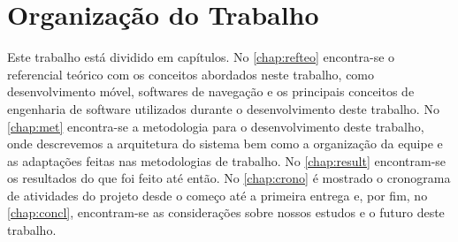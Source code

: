 \section{Organização do Trabalho}

Este trabalho está dividido em capítulos. No \autoref{chap:refteo} encontra-se o referencial teórico com os conceitos abordados neste trabalho, como desenvolvimento móvel, softwares de navegação e os principais conceitos de engenharia de software utilizados durante o desenvolvimento deste trabalho. No \autoref{chap:met} encontra-se a metodologia para o desenvolvimento deste trabalho, onde descrevemos a arquitetura do sistema bem como a organização da equipe e as adaptações feitas nas metodologias de trabalho. No \autoref{chap:result} encontram-se os resultados do que foi feito até então. No \autoref{chap:crono} é mostrado o cronograma de atividades do projeto desde o começo até a primeira entrega e, por fim, no \autoref{chap:concl}, encontram-se as considerações sobre nossos estudos e o futuro deste trabalho.
